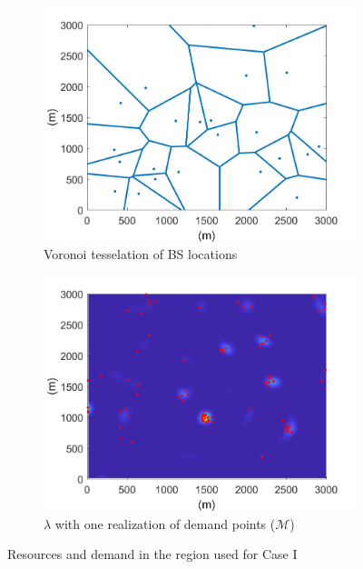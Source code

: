 \documentclass[12pt,dvipsnames]{report}
\begin{document}
\begin{figure}[htp]
	\centering
	\begin{subfigure}{.49\textwidth}
		\centering
		\includegraphics[width=1\linewidth]{Figures/CaseI_BSLocationsVoronoi}
		\caption{\small Voronoi tesselation of BS locations}
		\label{fig:CaseI_BSLocVor}
	\end{subfigure} \hfill
	\begin{subfigure}{.49\textwidth}
		\centering
		\includegraphics[width=1\linewidth]{Figures/CaseI_SSLTnsPPP_demandpointreal}
		\caption{\small $\lambda$ with one realization of demand points ($\mathcal{M}$)}
		\label{fig:CaseI_SSLTDPReal}
	\end{subfigure}
	\caption{Resources and demand in the region used for Case I}
	\label{fig:CaseI_NetworkArea}
\end{figure}
\end{document}
